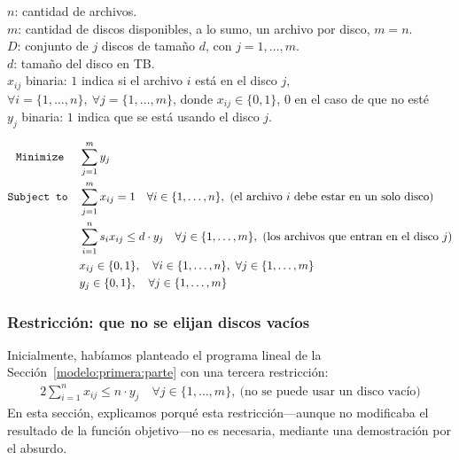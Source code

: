 \documentclass[11pt, a4paper, pdftex]{article}
\begin{document}
$n$: cantidad de archivos. \\

$m$: cantidad de discos disponibles, a lo sumo, un archivo por disco, $m = n$. \\

$D$: conjunto de $j$ discos de tamaño $d$, con $j = 1, \ldots, m$. \\

$d$: tamaño del disco en TB. \\ 

$x_{ij}$ binaria: $1$ indica si el archivo $i$ está en el disco $j$, $\forall i = \{1, \ldots, n\},\ \forall j = \{1, \ldots, m\}$, donde $x_{ij} \in \{0, 1\}$, $0$ en el caso de que no esté\\

$y_{j}$ binaria: $1$ indica que se está usando el disco $j$.

\begin{alignat*}{2}
	\texttt{Minimize}\quad\,\,
	& \sum_{j = 1}^{m} y_{j}\\
	\texttt{Subject to}\quad
	& \sum_{j = 1}^{m} x_{ij} = 1 \quad \forall i \in \{1, \ldots, n\},\ \text{(el archivo $i$ debe estar en un solo disco)}\\
	& \sum_{i = 1}^{n} s_{i} x_{ij} \le d\cdot y_{j} \quad \forall j \in \{1, \ldots, m\},\ \text{(los archivos que entran en el disco $j$)}\\
	& x_{ij} \in \{0,1\}, \quad \forall i \in \{1, \ldots, n\}, \ \forall j \in \{1, \ldots, m\}\\
	& y_{j} \in \{0,1\}, \quad \forall j \in \{1, \ldots, m\}
\end{alignat*}

\subsubsection{Restricción: que no se elijan discos vacíos}

Inicialmente, habíamos planteado el programa lineal de la
Sección~\ref{modelo:primera:parte} con una tercera restricción:
\begin{alignat*}{2}
    \sum_{i = 1}^{n} x_{ij} \le n\cdot y_{j} \quad \forall j \in \{1,
	\ldots, m\},\ \text{(no se puede usar un disco vacío)}
\end{alignat*}
En esta sección, explicamos porqué esta restricción---aunque no
modificaba el resultado de la función objetivo---no es necesaria,
mediante una demostración por el absurdo.
\end{document}

